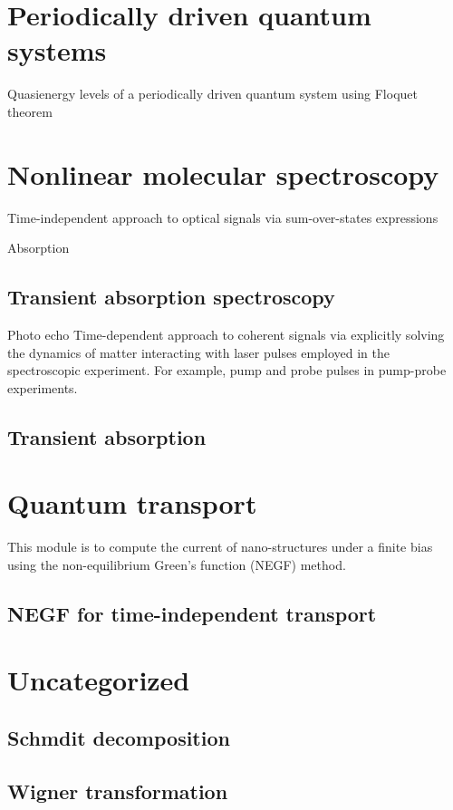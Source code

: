 \documentclass[a4paper,12pt]{book}
\begin{document}
\chapter{Periodically driven quantum systems}
Quasienergy levels of a periodically driven quantum system using Floquet theorem


\chapter{Nonlinear molecular spectroscopy}
Time-independent approach to optical signals via sum-over-states expressions

Absorption
\section{Transient absorption spectroscopy}
Photo echo
Time-dependent approach to coherent signals via explicitly solving the dynamics of matter interacting with laser pulses employed in the spectroscopic experiment. For example, pump and probe pulses in pump-probe experiments.

\section{Transient absorption}

\chapter{ Quantum transport}
This module is to compute the current of nano-structures under a finite bias using the non-equilibrium Green's function (NEGF) method.

\section{NEGF for time-independent transport}


\chapter{Uncategorized}

\section{Schmdit decomposition}
\section{Wigner transformation}
\end{document}
